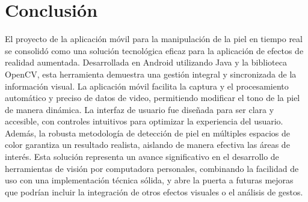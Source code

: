 \documentclass[conference]{IEEEtran}
\begin{document}
\section{Conclusión}
El proyecto de la aplicación móvil para la manipulación de la piel en tiempo real se consolidó como una solución tecnológica eficaz para la aplicación de efectos de realidad aumentada. Desarrollada en Android utilizando Java y la biblioteca OpenCV, esta herramienta demuestra una gestión integral y sincronizada de la información visual\cite{c10}.
La aplicación móvil facilita la captura y el procesamiento automático y preciso de datos de video, permitiendo modificar el tono de la piel de manera dinámica. La interfaz de usuario fue diseñada para ser clara y accesible, con controles intuitivos para optimizar la experiencia del usuario.
Además, la robusta metodología de detección de piel en múltiples espacios de color garantiza un resultado realista, aislando de manera efectiva las áreas de interés. Esta solución representa un avance significativo en el desarrollo de herramientas de visión por computadora personales, combinando la facilidad de uso con una implementación técnica sólida, y abre la puerta a futuras mejoras que podrían incluir la integración de otros efectos visuales o el análisis de gestos.


\clearpage




\printbibliography
\end{document}
